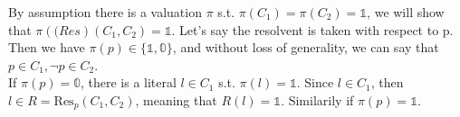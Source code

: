 \begin{myproof}
        By assumption there is a valuation $\pi$ s.t. $\pi(C_1) = \pi(C_2) = \mathbb{1}$, we will show that $\pi(\mathrm(Res)(C_1,C_2) = \mathbb{1}$. Let's say the resolvent is taken with respect to p. Then we have $\pi(p) \in \{\mathbb{1},\mathbb{0}\}$, and without loss of generality, we can say that $p \in C_1, \neg p \in C_2$.\\
        If $\pi(p) = \mathbb{0}$, there is a literal $l \in C_1$ s.t. $\pi(l) = \mathbb{1}$. Since  $l \in C_1$, then $l \in R = \mathrm{Res}_p(C_1,C_2)$, meaning that $R(l) = \mathbb{1}$. Similarily if $\pi(p) = \mathbb{1}$.

\end{myproof}



